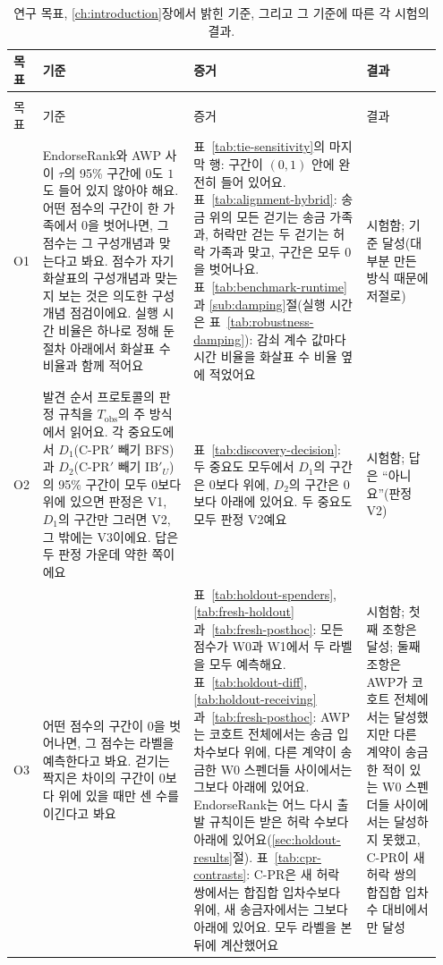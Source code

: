 {\footnotesize{}\setlength{\tabcolsep}{3.5pt}%
\begin{longtable}{@{}>{\raggedright\arraybackslash}p{0.05\linewidth}>{\raggedright\arraybackslash}p{0.34\linewidth}>{\raggedright\arraybackslash}p{0.39\linewidth}>{\raggedright\arraybackslash}p{0.17\linewidth}@{}}
\caption{연구 목표, \ref{ch:introduction}장에서 밝힌 기준, 그리고 그 기준에 따른 각 시험의 결과.}\label{tab:objectives-achievement}\\
\toprule
목표 & 기준 & 증거 & 결과 \\
\midrule
\endfirsthead
\multicolumn{4}{@{}l}{\small 표~\thetable\ (이어짐)}\\
\toprule
목표 & 기준 & 증거 & 결과 \\
\midrule
\endhead
\bottomrule
\endfoot
O1 & EndorseRank와 AWP 사이 $\tau$의 95\% 구간에 $0$도 $1$도 들어 있지 않아야 해요. 어떤 점수의 구간이 한 가족에서 $0$을 벗어나면, 그 점수는 그 구성개념과 맞는다고 봐요. 점수가 자기 화살표의 구성개념과 맞는지 보는 것은 의도한 구성개념 점검이에요. 실행 시간 비율은 하나로 정해 둔 절차 아래에서 화살표 수 비율과 함께 적어요 & 표~\ref{tab:tie-sensitivity}의 마지막 행: 구간이 $(0,1)$ 안에 완전히 들어 있어요. 표~\ref{tab:alignment-hybrid}: 송금 위의 모든 걷기는 송금 가족과, 허락만 걷는 두 걷기는 허락 가족과 맞고, 구간은 모두 $0$을 벗어나요. 표~\ref{tab:benchmark-runtime}과 \ref{sub:damping}절(실행 시간은 표~\ref{tab:robustness-damping}): 감쇠 계수 값마다 시간 비율을 화살표 수 비율 옆에 적었어요 & 시험함; 기준 달성(대부분 만든 방식 때문에 저절로) \\
\addlinespace
O2 & 발견 순서 프로토콜의 판정 규칙을 $T_{\mathrm{obs}}$의 주 방식에서 읽어요. 각 중요도에서 $D_1$(\mbox{C-PR}$'$ 빼기 BFS)과 $D_2$(\mbox{C-PR}$'$ 빼기 $\mathrm{IB}'_U$)의 95\% 구간이 모두 $0$보다 위에 있으면 판정은 V1, $D_1$의 구간만 그러면 V2, 그 밖에는 V3이에요. 답은 두 판정 가운데 약한 쪽이에요 & 표~\ref{tab:discovery-decision}: 두 중요도 모두에서 $D_1$의 구간은 $0$보다 위에, $D_2$의 구간은 $0$보다 아래에 있어요. 두 중요도 모두 판정 V2예요 & 시험함; 답은 “아니요”(판정 V2) \\
\addlinespace
O3 & 어떤 점수의 구간이 $0$을 벗어나면, 그 점수는 라벨을 예측한다고 봐요. 걷기는 짝지은 차이의 구간이 $0$보다 위에 있을 때만 센 수를 이긴다고 봐요 & 표~\ref{tab:holdout-spenders}, \ref{tab:fresh-holdout}과~\ref{tab:fresh-posthoc}: 모든 점수가 W0과 W1에서 두 라벨을 모두 예측해요. 표~\ref{tab:holdout-diff}, \ref{tab:holdout-receiving}과~\ref{tab:fresh-posthoc}: AWP는 코호트 전체에서는 송금 입차수보다 위에, 다른 계약이 송금한 W0 스펜더들 사이에서는 그보다 아래에 있어요. EndorseRank는 어느 다시 출발 규칙이든 받은 허락 수보다 아래에 있어요(\ref{sec:holdout-results}절). 표~\ref{tab:cpr-contrasts}: \mbox{C-PR}은 새 허락 쌍에서는 합집합 입차수보다 위에, 새 송금자에서는 그보다 아래에 있어요. 모두 라벨을 본 뒤에 계산했어요 & 시험함; 첫째 조항은 달성; 둘째 조항은 AWP가 코호트 전체에서는 달성했지만 다른 계약이 송금한 적이 있는 W0 스펜더들 사이에서는 달성하지 못했고, \mbox{C-PR}이 새 허락 쌍의 합집합 입차수 대비에서만 달성 \\

\end{longtable}}
